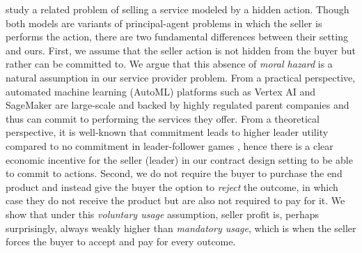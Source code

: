 \citet{bernasconi2024agent} study a related problem of selling a service modeled by a hidden action. Though both models are variants of principal-agent problems in which the seller is performs the action, there are two fundamental differences between their setting and ours. First, we assume that the seller action is not hidden from the buyer  but rather can be committed to. We argue that this absence of \emph{moral hazard} is a natural assumption in our service provider problem. From a practical perspective, automated machine learning (AutoML) platforms such as Vertex AI and SageMaker are large-scale and backed by highly regulated parent companies and thus can commit to performing the services they offer. From a theoretical perspective, it is well-known that commitment leads to higher leader utility compared to no commitment in leader-follower games \citep{von2010leadership}, hence there is a clear economic incentive for the seller (leader) in our contract design setting to be able to commit to actions. Second, we do not require the buyer to purchase the end product and instead give the buyer the option to \emph{reject} the outcome, in which case they do not receive the product but are also not required to pay for it. We show that under this \emph{voluntary usage} assumption, seller profit is, perhaps surprisingly, always weakly higher than \emph{mandatory usage}, which is when the seller forces the buyer to accept and pay for every outcome.



